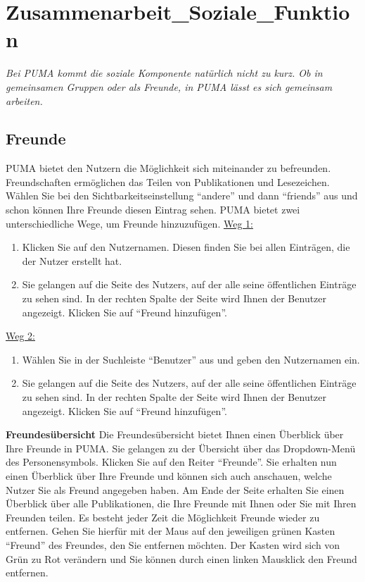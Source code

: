 \section{Zusammenarbeit_Soziale_Funktion}
\textit{Bei PUMA kommt die soziale Komponente natürlich nicht zu kurz. Ob in gemeinsamen Gruppen oder als Freunde, in PUMA lässt es sich gemeinsam arbeiten.}
\subsection{Freunde}%
PUMA bietet den Nutzern die Möglichkeit sich miteinander zu befreunden. Freundschaften ermöglichen das Teilen von Publikationen und Lesezeichen. Wählen Sie bei den Sichtbarkeitseinstellung \enquote{andere} und dann \enquote{friends} aus und schon können Ihre Freunde diesen Eintrag sehen.
PUMA bietet zwei unterschiedliche Wege, um Freunde hinzuzufügen.
\newline
\newline
\underline{Weg 1:}
\begin{enumerate}
    \item Klicken Sie auf den Nutzernamen. Diesen finden Sie bei allen Einträgen, die der Nutzer erstellt hat.
    \item Sie gelangen auf die Seite des Nutzers, auf der alle seine öffentlichen Einträge zu sehen sind. In der rechten Spalte der Seite wird Ihnen der Benutzer angezeigt. Klicken Sie auf \enquote{Freund hinzufügen}.
\end{enumerate}
\underline{Weg 2:}
\begin{enumerate}
    \item Wählen Sie in der Suchleiste \enquote{Benutzer} aus und geben den Nutzernamen ein.
    \item Sie gelangen auf die Seite des Nutzers, auf der alle seine öffentlichen Einträge zu sehen sind. In der rechten Spalte der Seite wird Ihnen der Benutzer angezeigt. Klicken Sie auf \enquote{Freund hinzufügen}.
\end{enumerate}
\textbf{Freundesübersicht} \newline
Die Freundesübersicht bietet Ihnen einen Überblick über Ihre Freunde in PUMA. Sie gelangen zu der Übersicht über das Dropdown-Menü des Personensymbols. Klicken Sie auf den Reiter \enquote{Freunde}. Sie erhalten nun einen Überblick über Ihre Freunde und können sich auch anschauen, welche Nutzer Sie als Freund angegeben haben. Am Ende der Seite erhalten Sie einen Überblick über alle Publikationen, die Ihre Freunde mit Ihnen oder Sie mit Ihren Freunden teilen.\newline
Es besteht jeder Zeit die Möglichkeit Freunde wieder zu entfernen. Gehen Sie hierfür mit der Maus auf den jeweiligen grünen Kasten \enquote{Freund} des Freundes, den Sie entfernen möchten. Der Kasten wird sich von Grün zu Rot verändern und Sie können durch einen linken Mausklick den Freund entfernen. 
